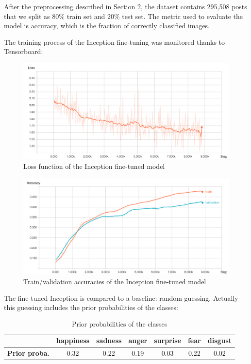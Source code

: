 After the preprocessing described in Section 2, the dataset contains 295,508 posts that we split as 80\% train set and 20\% test set. The metric used to evaluate the model is accuracy, which is the fraction of correctly classified images.

The training process of the Inception fine-tuning was monitored thanks to Tensorboard:
\begin{figure}[H]
    \centering
    \includegraphics[width=\textwidth]{Images/image_model_loss_cleaned.jpg}
    \caption{Loss function of the Inception fine-tuned model}
\end{figure}

\begin{figure}[H]
    \centering
    \includegraphics[width=\textwidth]{Images/image_model_accuracies_cleaned.jpg}
    \caption{Train/validation accuracies of the Inception fine-tuned model}
\end{figure}

The fine-tuned Inception is compared to a baseline: random guessing. Actually this guessing includes the prior probabilities of the classes: 
\begin{table}[H]
\begin{center}
    \begin{tabular}{| c | c | c | c | c | c | c |}
    \hline
     & \textbf{happiness} & \textbf{sadness} &  \textbf{anger} & \textbf{surprise} & \textbf{fear} & \textbf{disgust} \\ \hline
    \textbf{Prior proba.} & 0.32 & 0.22 & 0.19 & 0.03 & 0.22 & 0.02 \\
    \hline
    \end{tabular}
\end{center} 
\caption{Prior probabilities of the classes}
\end{table}

